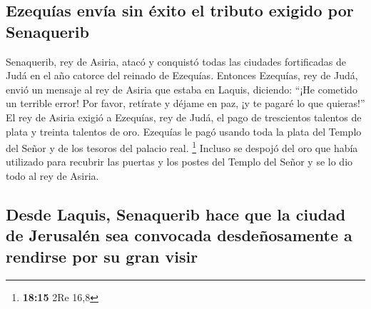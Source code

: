 \hypertarget{ezequuxedas-envuxeda-sin-uxe9xito-el-tributo-exigido-por-senaquerib}{%
\subsection{Ezequías envía sin éxito el tributo exigido por
Senaquerib}\label{ezequuxedas-envuxeda-sin-uxe9xito-el-tributo-exigido-por-senaquerib}}

 Senaquerib, rey de Asiria, atacó y conquistó todas las
ciudades fortificadas de Judá en el año catorce del reinado de Ezequías.
 Entonces Ezequías, rey de Judá, envió un mensaje al rey
de Asiria que estaba en Laquis, diciendo: ``¡He cometido un terrible
error! Por favor, retírate y déjame en paz, ¡y te pagaré lo que
quieras!'' El rey de Asiria exigió a Ezequías, rey de Judá, el pago de
trescientos talentos de plata y treinta talentos de oro. 
Ezequías le pagó usando toda la plata del Templo del Señor y de los
tesoros del palacio real. \footnote{\textbf{18:15} 2Re 16,8}
 Incluso se despojó del oro que había utilizado para
recubrir las puertas y los postes del Templo del Señor y se lo dio todo
al rey de Asiria.

\hypertarget{desde-laquis-senaquerib-hace-que-la-ciudad-de-jerusaluxe9n-sea-convocada-desdeuxf1osamente-a-rendirse-por-su-gran-visir}{%
\subsection{Desde Laquis, Senaquerib hace que la ciudad de Jerusalén sea
convocada desdeñosamente a rendirse por su gran
visir}\label{desde-laquis-senaquerib-hace-que-la-ciudad-de-jerusaluxe9n-sea-convocada-desdeuxf1osamente-a-rendirse-por-su-gran-visir}}

